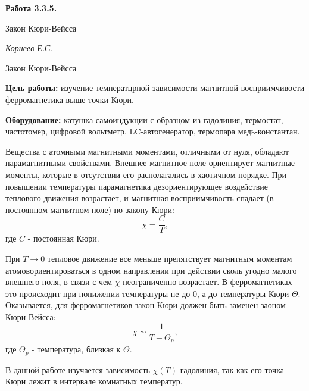 \documentclass[14pt]{article}
\begin{document}
\begin{titlepage}
	\begin{center}
		\fontsize{18pt}{20pt}\selectfont
		\textbf{Работа 3.3.5.}	
	
		\vspace{5cm}
		\fontsize{24pt}{25pt}\selectfont
		Закон Кюри-Вейсса
	\end{center}
	\begin{flushright}
		\fontsize{18pt}{20pt}\selectfont
		\vspace{14cm}
		\hspace{-3cm}
		\textit{Корнеев Е.С.}
	\end{flushright}		
\end{titlepage}

\begin{center}
	\fontsize{16pt}{18pt}\selectfont	
	Закон Кюри-Вейсса
\end{center}


\fontsize{14pt}{16pt}\selectfont
\vspace{1cm}
\textbf{Цель работы:} изучение температцрной зависимости магнитной восприимчивости ферромагнетика выше точки Кюри.

\vspace{0.5cm}
\textbf{Оборудование:} катушка самоиндукции с образцом из гадолиния, термостат, частотомер, цифровой вольтметр, LC-автогенератор, термопара медь-константан. 

\vspace{1cm}
Вещества с атомными магнитными моментами, отличными от нуля, обладают парамагнитными свойствами. Внешнее магнитное поле ориентирует магнитные моменты, которые в отсутствии его располагались в хаотичном порядке. При повышении температуры парамагнетика дезориентирующее воздействие теплового движения возрастает, и магнитная восприимчивость спадает (в постоянном магнитном поле) по закону Кюри:
$$
	\chi = \frac{C}{T},
$$
\noindent где $C$ - постоянная Кюри.

При $T \rightarrow 0$ тепловое движение все меньше препятствует магнитным моментам атомовориентироваться в одном направлении при действии сколь угодно малого внешнего поля, в связи с чем $\chi$ неограниченно возрастает. В ферромагнетиках это происходит при понижении температуры не до 0, а до температуры Кюри $\Theta$. Оказывается, для ферромагнетиков закон Кюри должен быть заменен заоном Кюри-Вейсса:
$$
	\chi \sim \frac{1}{T - \Theta_p},
$$
\noindent где $\Theta_p$ - температура, близкая к $\Theta$.

В данной работе изучается зависимость $\chi(T)$ гадолиния, так как его точка Кюри лежит в интервале комнатных температур.
\end{document}
